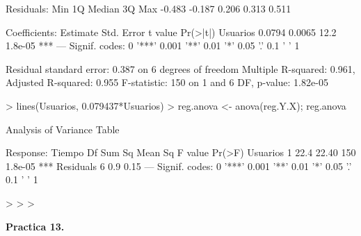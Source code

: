 \documentclass{article}
\begin{document}
\begin{Schunk}
\begin{Soutput}
Residuals:
   Min     1Q Median     3Q    Max 
-0.483 -0.187  0.206  0.313  0.511 

Coefficients:
         Estimate Std. Error t value Pr(>|t|)    
Usuarios   0.0794     0.0065    12.2  1.8e-05 ***
---
Signif. codes:  0 '***' 0.001 '**' 0.01 '*' 0.05 '.' 0.1 ' ' 1

Residual standard error: 0.387 on 6 degrees of freedom
Multiple R-squared:  0.961,	Adjusted R-squared:  0.955 
F-statistic:  150 on 1 and 6 DF,  p-value: 1.82e-05
\end{Soutput}
\begin{Sinput}
> lines(Usuarios, 0.079437*Usuarios)
> reg.anova <- anova(reg.Y.X); reg.anova
\end{Sinput}
\begin{Soutput}
Analysis of Variance Table

Response: Tiempo
          Df Sum Sq Mean Sq F value  Pr(>F)    
Usuarios   1   22.4   22.40     150 1.8e-05 ***
Residuals  6    0.9    0.15                    
---
Signif. codes:  0 '***' 0.001 '**' 0.01 '*' 0.05 '.' 0.1 ' ' 1
\end{Soutput}
\begin{Sinput}
> 
> 
> 
\end{Sinput}
\end{Schunk}



\textbf{Practica 13.}
\end{document}
